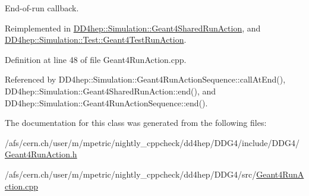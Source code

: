 End-\/of-\/run callback. 



Reimplemented in \hyperlink{class_d_d4hep_1_1_simulation_1_1_geant4_shared_run_action_af723af818fd7798e910dcfef30092345}{D\+D4hep\+::\+Simulation\+::\+Geant4\+Shared\+Run\+Action}, and \hyperlink{class_d_d4hep_1_1_simulation_1_1_test_1_1_geant4_test_run_action_a9cffefeecef4c952ad1fbbc80893aac8}{D\+D4hep\+::\+Simulation\+::\+Test\+::\+Geant4\+Test\+Run\+Action}.



Definition at line 48 of file Geant4\+Run\+Action.\+cpp.



Referenced by D\+D4hep\+::\+Simulation\+::\+Geant4\+Run\+Action\+Sequence\+::call\+At\+End(), D\+D4hep\+::\+Simulation\+::\+Geant4\+Shared\+Run\+Action\+::end(), and D\+D4hep\+::\+Simulation\+::\+Geant4\+Run\+Action\+Sequence\+::end().



The documentation for this class was generated from the following files\+:\begin{DoxyCompactItemize}
\item 
/afs/cern.\+ch/user/m/mpetric/nightly\+\_\+cppcheck/dd4hep/\+D\+D\+G4/include/\+D\+D\+G4/\hyperlink{_geant4_run_action_8h}{Geant4\+Run\+Action.\+h}\item 
/afs/cern.\+ch/user/m/mpetric/nightly\+\_\+cppcheck/dd4hep/\+D\+D\+G4/src/\hyperlink{_geant4_run_action_8cpp}{Geant4\+Run\+Action.\+cpp}\end{DoxyCompactItemize}

